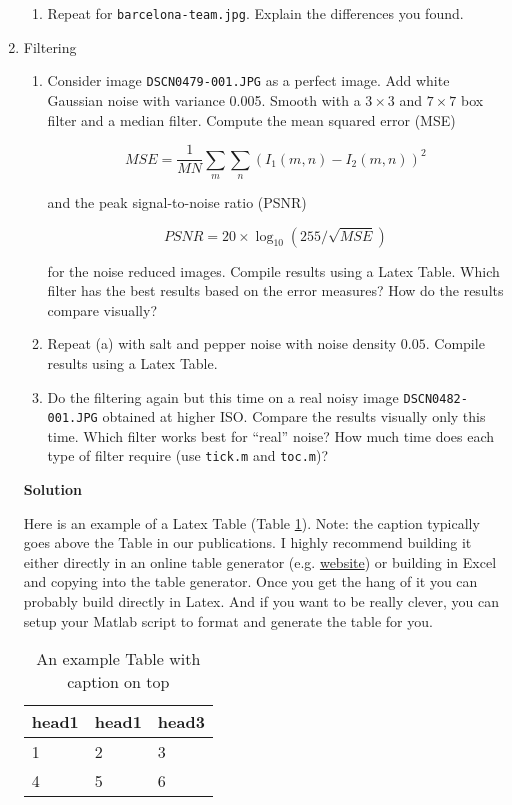 \documentclass[letterpaper,11pt]{article}
\begin{document}
\begin{enumerate}
\begin{enumerate}
\item Repeat for \texttt{barcelona-team.jpg}.  Explain the differences you found.

\end{enumerate}


\pagebreak
\item Filtering

\begin{enumerate}
\item Consider image \texttt{DSCN0479-001.JPG} as a perfect image.  Add white Gaussian noise with variance 0.005.  Smooth with a $3\times3$ and $7\times7$ box filter and a median filter.  Compute the mean squared error (MSE)

$$MSE = \frac{1}{MN}\sum_m \sum_n (I_1(m,n) - I_2(m,n))^2 $$ 

and the peak signal-to-noise ratio (PSNR) 

$$PSNR = 20 \times \log_{10}(255/ \sqrt{MSE}) $$

for the noise reduced images.  Compile results using a Latex Table.  Which filter has the best results based on the error measures?  How do the results compare visually?  

\item Repeat (a) with salt and pepper noise with noise density $0.05$.   Compile results using a Latex Table.  

\item Do the filtering again but this time on a real noisy image \texttt{DSCN0482-001.JPG} obtained at higher ISO.  Compare the results visually only this time.  Which filter works best for ``real'' noise?  How much time does each type of filter require (use \texttt{tick.m} and \texttt{toc.m})?

\end{enumerate}

\textbf{Solution}

Here is an example of a Latex Table (Table \ref{tab:table}).  Note: the caption typically goes above the Table in our publications.  I highly recommend building it either directly in an online table generator (e.g. \href{https://www.tablesgenerator.com/}{website}) or building in Excel and copying into the table generator.  Once you get the hang of it you can probably build directly in Latex.  And if you want to be really clever, you can setup your Matlab script to format and generate the table for you.

\begin{table}[!hb]
\centering
\caption{An example Table with caption on top}
\label{tab:table}
\begin{tabular}{@{}lll@{}}
\toprule
head1 & head1 & head3 \\ 
\midrule
1     & 2     & 3     \\
4     & 5     & 6     \\ 
\bottomrule
\end{tabular}
\end{table}


\end{enumerate}
\end{document}
